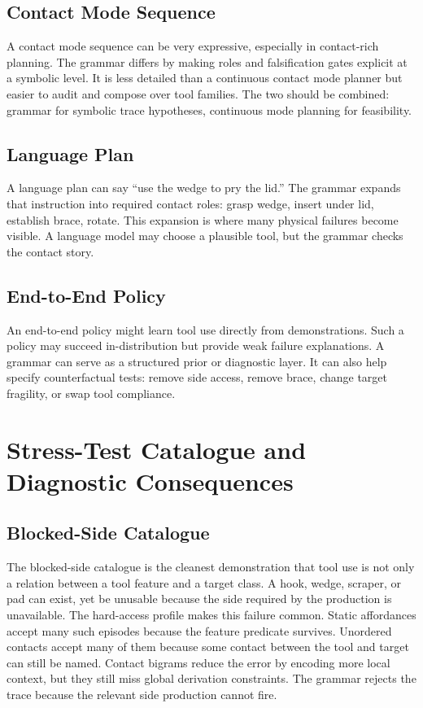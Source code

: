 \documentclass{article}
\begin{document}
\subsection{Contact Mode Sequence}

A contact mode sequence can be very expressive, especially in contact-rich planning. The grammar differs by making roles and falsification gates explicit at a symbolic level. It is less detailed than a continuous contact mode planner but easier to audit and compose over tool families. The two should be combined: grammar for symbolic trace hypotheses, continuous mode planning for feasibility.

\subsection{Language Plan}

A language plan can say ``use the wedge to pry the lid.'' The grammar expands that instruction into required contact roles: grasp wedge, insert under lid, establish brace, rotate. This expansion is where many physical failures become visible. A language model may choose a plausible tool, but the grammar checks the contact story.

\subsection{End-to-End Policy}

An end-to-end policy might learn tool use directly from demonstrations. Such a policy may succeed in-distribution but provide weak failure explanations. A grammar can serve as a structured prior or diagnostic layer. It can also help specify counterfactual tests: remove side access, remove brace, change target fragility, or swap tool compliance.

\section{Stress-Test Catalogue and Diagnostic Consequences}

\subsection{Blocked-Side Catalogue}

The blocked-side catalogue is the cleanest demonstration that tool use is not only a relation between a tool feature and a target class. A hook, wedge, scraper, or pad can exist, yet be unusable because the side required by the production is unavailable. The hard-access profile makes this failure common. Static affordances accept many such episodes because the feature predicate survives. Unordered contacts accept many of them because some contact between the tool and target can still be named. Contact bigrams reduce the error by encoding more local context, but they still miss global derivation constraints. The grammar rejects the trace because the relevant side production cannot fire.
\end{document}
